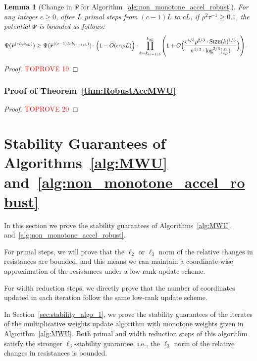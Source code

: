 \documentclass[11pt]{article}
\newtheorem{lemma}[theorem]{Lemma}
\let\originalleft\left
\let\originalright\right
\renewcommand{\left}{\mathopen{}\mathclose\bgroup\originalleft}
\renewcommand{\right}{\aftergroup\egroup\originalright}
\newcommand\rr{\boldsymbol{\mathit{r}}}
\newcommand{\wt}{\widetilde}
\newcommand{\ov}{\overline}
\begin{document}
\begin{lemma}[Change in $\Psi$ for Algorithm~\ref{alg:non_monotone_accel_robust}]\label{lem:ChangePsiRobust}
For any integer $c \geq 0$, after $L$ primal steps from $(c-1)L$ to $cL$, if $\rho^2 \tau^{-1} \geq 0.1$, the potential $\Psi$ is bounded as follows:
\begin{align*}
\Psi(\ov{\rr}^{(cL,k_{cL})}) 
\geq &~ \Psi(\ov{\rr}^{((c-1)L,k_{(c-1)L})}) \cdot \Big(1 -  \wt{O}(\epsilon \alpha \rho L) \Big) \cdot \prod_{k=k_{(c-1)L}}^{k_{cL}} \left( 1 + O\Big(\frac{\epsilon^{4/3} \rho^{2/3} \cdot \textsc{Size}(k)^{1/3}}{n^{1/3} \cdot \log^{2/3}(\frac{n}{\epsilon \rho})}\Big) \right).
\end{align*}
\end{lemma}
\begin{proof}\textcolor{red}{TOPROVE 19}\end{proof}


\subsubsection*{Proof of Theorem~\ref{thm:RobustAccMWU}}
\begin{proof}\textcolor{red}{TOPROVE 20}\end{proof}




 \section{Stability Guarantees of Algorithms~\ref{alg:MWU} and~\ref{alg:non_monotone_accel_robust}}\label{sec:StabilityMWU}
In this section we prove the stability guarantees of Algorithms~\ref{alg:MWU} and~\ref{alg:non_monotone_accel_robust}. 

For primal steps, we will prove that the $\ell_2$ or $\ell_3$ norm of the relative changes in resistances are bounded, and this means we can maintain a coordinate-wise approximation of the resistances under a low-rank update scheme. 

For width reduction steps, we directly prove that the number of coordinates updated in each iteration follow the same low-rank update scheme.

In Section~\ref{sec:stability_algo_1}, we prove the stability guarantees of the iterates of the multiplicative weights update algorithm with monotone weights given in Algorithm~\ref{alg:MWU}. Both primal and width reduction steps of this algorithm satisfy the stronger $\ell_3$-stability guarantee, i.e., the $\ell_3$ norm of the relative changes in resistances is bounded.
\end{document}
